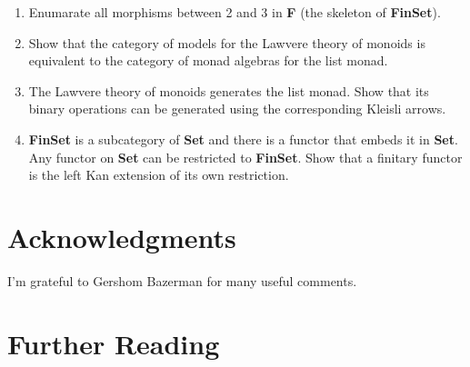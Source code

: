 \begin{enumerate}
\tightlist
\item
  Enumarate all morphisms between 2 and 3 in \textbf{F} (the skeleton of
  \textbf{FinSet}).
\item
  Show that the category of models for the Lawvere theory of monoids is
  equivalent to the category of monad algebras for the list monad.
\item
  The Lawvere theory of monoids generates the list monad. Show that its
  binary operations can be generated using the corresponding Kleisli
  arrows.
\item
  \textbf{FinSet} is a subcategory of \textbf{Set} and there is a
  functor that embeds it in \textbf{Set}. Any functor on \textbf{Set}
  can be restricted to \textbf{FinSet}. Show that a finitary functor is
  the left Kan extension of its own restriction.
\end{enumerate}

\section{Acknowledgments}\label{acknowledgments}

I'm grateful to Gershom Bazerman for many useful comments.

\section{Further Reading}\label{further-reading}
